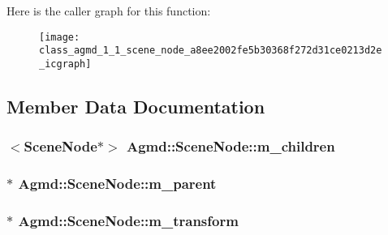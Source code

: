 Here is the caller graph for this function\+:\nopagebreak
\begin{figure}[H]
\begin{center}
\leavevmode
\texttt{[image: class\_agmd\_1\_1\_scene\_node\_a8ee2002fe5b30368f272d31ce0213d2e\_icgraph]}
\end{center}
\end{figure}




\subsection{Member Data Documentation}
\hypertarget{class_agmd_1_1_scene_node_aa2657c3c7b7bdae0fab8a4e66170a6c4}{
\subsubsection[{m\+\_\+children}]{$<${\bf Scene\+Node}$\ast$$>$ Agmd\+::\+Scene\+Node\+::m\+\_\+children\hspace{0.3cm}{\ttfamily [protected]}}}\label{class_agmd_1_1_scene_node_aa2657c3c7b7bdae0fab8a4e66170a6c4}
\hypertarget{class_agmd_1_1_scene_node_a5112314f51117dbd59cd43330dfb50d7}{
\subsubsection[{m\+\_\+parent}]{$\ast$ Agmd\+::\+Scene\+Node\+::m\+\_\+parent\hspace{0.3cm}{\ttfamily [protected]}}}\label{class_agmd_1_1_scene_node_a5112314f51117dbd59cd43330dfb50d7}
\hypertarget{class_agmd_1_1_scene_node_a0587fe34600b0ba0f739d04b0712553e}{
\subsubsection[{m\+\_\+transform}]{$\ast$ Agmd\+::\+Scene\+Node\+::m\+\_\+transform\hspace{0.3cm}{\ttfamily [protected]}}}\label{class_agmd_1_1_scene_node_a0587fe34600b0ba0f739d04b0712553e}
